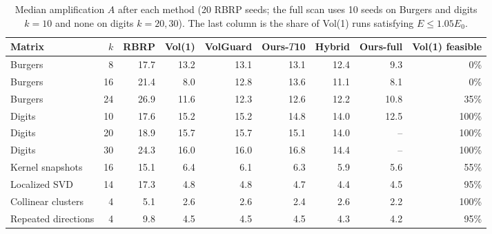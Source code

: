 \begin{table}[t]
\centering\small
\caption{Median amplification $A$ after each method (20 RBRP seeds; the full scan uses 10 seeds on Burgers and digits $k{=}10$ and none on digits $k{=}20,30$). The last column is the share of Vol(1) runs satisfying $E\le1.05E_0$.}\label{tab:compare}
\begin{adjustbox}{max width=\linewidth}
\begin{tabular}{lrrrrrrrr}
\toprule
Matrix & $k$ & RBRP & Vol(1) & VolGuard & Ours-$T$10 & Hybrid & Ours-full & Vol(1) feasible \\
\midrule
Burgers & 8 & 17.7 & 13.2 & 13.1 & 13.1 & 12.4 & 9.3 & 0\% \\
Burgers & 16 & 21.4 & 8.0 & 12.8 & 13.6 & 11.1 & 8.1 & 0\% \\
Burgers & 24 & 26.9 & 11.6 & 12.3 & 12.6 & 12.2 & 10.8 & 35\% \\
Digits & 10 & 17.6 & 15.2 & 15.2 & 14.8 & 14.0 & 12.5 & 100\% \\
Digits & 20 & 18.9 & 15.7 & 15.7 & 15.1 & 14.0 & -- & 100\% \\
Digits & 30 & 24.3 & 16.0 & 16.0 & 16.8 & 14.4 & -- & 100\% \\
Kernel snapshots & 16 & 15.1 & 6.4 & 6.1 & 6.3 & 5.9 & 5.6 & 55\% \\
Localized SVD & 14 & 17.3 & 4.8 & 4.8 & 4.7 & 4.4 & 4.5 & 95\% \\
Collinear clusters & 4 & 5.1 & 2.6 & 2.6 & 2.4 & 2.6 & 2.2 & 100\% \\
Repeated directions & 4 & 9.8 & 4.5 & 4.5 & 4.5 & 4.3 & 4.2 & 95\% \\
\bottomrule
\end{tabular}
\end{adjustbox}
\end{table}
